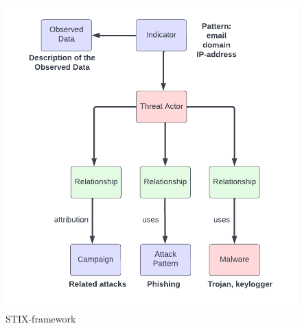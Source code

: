 \documentclass{article}
\begin{document}
		\begin{figure}[!htb]
			\centering
			\includegraphics[width=\linewidth]{stix-test.png}
			\caption{STIX-framework}
			\label{STIX-framework}
		\end{figure}
	
\end{document}
